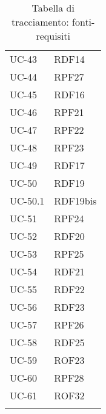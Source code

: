 \begin{longtable}{| p{5cm} | p{5cm} |}
		\rowcolor{LightGray}
		UC-43 & RDF14\\
		UC-44 & RPF27\\
		\rowcolor{LightGray}
		UC-45 & RDF16\\
		UC-46 & RPF21\\
		\rowcolor{LightGray}
		UC-47 & RPF22\\
		UC-48 & RPF23\\
		\rowcolor{LightGray}
		UC-49 & RDF17 \\
		UC-50 & RDF19 \\
		UC-50.1 & RDF19bis \\
		\rowcolor{LightGray}
		UC-51 & RPF24 \\
		UC-52 & RDF20 \\
		\rowcolor{LightGray}
		UC-53 & RPF25 \\
		UC-54 & RDF21 \\
		\rowcolor{LightGray}
		UC-55 & RDF22 \\
		UC-56 & RDF23 \\
		\rowcolor{LightGray}
		UC-57 & RPF26 \\
		UC-58 & RDF25\\
		\rowcolor{LightGray}
		UC-59 & ROF23\\
		UC-60 & RPF28\\
		\rowcolor{LightGray}
		UC-61 & ROF32\\
		\hline
		\caption{Tabella di tracciamento: fonti-requisiti}
\end{longtable}
\newpage
